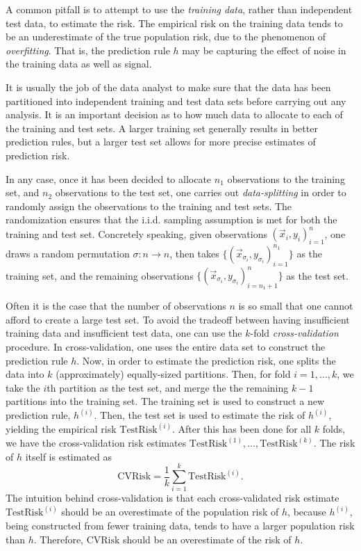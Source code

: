 A common pitfall is to attempt to use the \emph{training data}, rather
than independent test data, to estimate the risk.  The empirical risk
on the training data tends to be an underestimate of the true
population risk, due to the phenomenon of \emph{overfitting}.  That
is, the prediction rule $h$ may be capturing the effect of noise in
the training data as well as signal.

It is usually the job of the data analyst to make sure that the data
has been partitioned into independent training and test data sets
before carrying out any analysis.  It is an important decision as to
how much data to allocate to each of the training and test sets.  A
larger training set generally results in better prediction rules, but
a larger test set allows for more precise estimates of prediction
risk.

In any case, once it has been decided to allocate $n_1$ observations
to the training set, and $n_2$ observations to the test set, one
carries out \emph{data-splitting} in order to randomly assign the
observations to the training and test sets.  The randomization ensures
that the i.i.d. sampling assumption is met for both the training and
test set.  Concretely speaking, given observations $(\vec{x}_i,
y_i)_{i=1}^n$, one draws a random permutation $\sigma: n \to n$, then
takes $\{(\vec{x}_{\sigma_i}, y_{\sigma_i})_{i=1}^{n_1}\}$ as the
training set, and the remaining observations $\{(\vec{x}_{\sigma_i},
y_{\sigma_i})_{i=n_1 + 1}^{n}\}$ as the test set.

Often it is the case that the number of observations $n$ is so small
that one cannot afford to create a large test set.  To avoid the
tradeoff between having insufficient training data and insufficient
test data, one can use the $k$-fold \emph{cross-validation} procedure.
In cross-validation, one uses the entire data set to construct the
prediction rule $h$.  Now, in order to estimate the prediction risk,
one splits the data into $k$ (approximately) equally-sized partitions.
Then, for fold $i = 1,\hdots, k$, we take the $i$th partition as the
test set, and merge the the remaining $k-1$ partitions into the
training set.  The training set is used to construct a new prediction
rule, $h^{(i)}$.  Then, the test set is used to estimate the risk of
$h^{(i)}$, yielding the empirical risk $\text{TestRisk}^{(i)}$.  After
this has been done for all $k$ folds, we have the cross-validation
risk estimates $\text{TestRisk}^{(1)},\hdots, \text{TestRisk}^{(k)}$.
The risk of $h$ itself is estimated as
\[
\text{CVRisk} = \frac{1}{k}\sum_{i=1}^k \text{TestRisk}^{(i)}.
\]
The intuition behind cross-validation is that each cross-validated
risk estimate $\text{TestRisk}^{(i)}$ should be an overestimate of the
population risk of $h$, because $h^{(i)}$, being constructed from
fewer training data, tends to have a larger population risk than $h$.
Therefore, $\text{CVRisk}$ should be an overestimate of the risk of
$h$.

